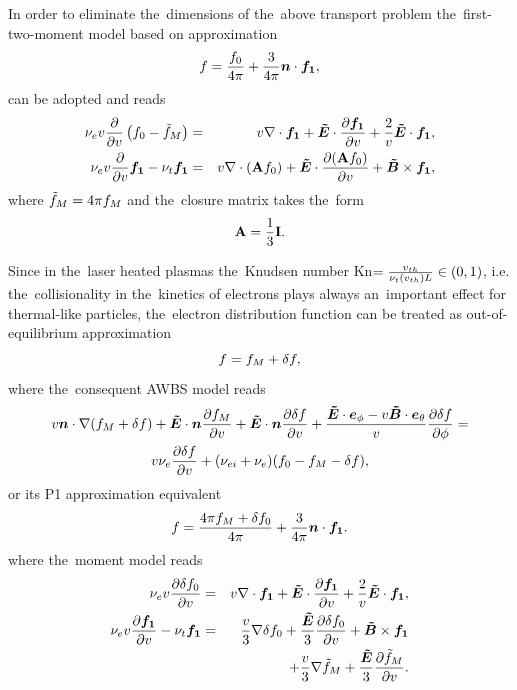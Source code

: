 In order to eliminate the~dimensions of the~above transport problem 
the~first-two-moment model based on approximation 
\begin{equation}
  f = \frac{f_0}{4\pi} + \frac{3}{4\pi}\boldsymbol{n}\cdot{\boldsymbol{f_1}} , 
  \nonumber \label{eq:OOE_P1approximation}
\end{equation}
can be adopted and reads
\begin{eqnarray}
  \nu_{e}v\frac{\partial{}}{\partial{v}}\left(f_0 - \tilde{f}_M \right) &=&
  v\nabla\cdot{\boldsymbol{f_1}} + \boldsymbol{\tilde{E}}\cdot
  \frac{\partial{{\boldsymbol{f_1}}}}{\partial{v}} + \frac{2}{v}\boldsymbol{\tilde{E}}\cdot{\boldsymbol{f_1}} , 
  \nonumber \label{eq:OOE_P1f0}\\
  \nu_{e}v\frac{\partial{}}{\partial{v}}{\boldsymbol{f_1}} - \nu_{t}{\boldsymbol{f_1}} &=& 
  v\nabla\cdot\left(\mathbf{A}f_0\right) + 
  \boldsymbol{\tilde{E}}\cdot\frac{\partial{\left(\mathbf{A}f_0\right)}}{\partial{v}} + \boldsymbol{\tilde{B}}\times{\boldsymbol{f_1}} ,
  \nonumber \label{eq:OOE_P1f1}
\end{eqnarray}
where $\tilde{f}_M = 4\pi f_M$ and the~closure matrix takes the~form
\begin{equation}
  \mathbf{A} = \frac{1}{3}\mathbf{I} .
  \nonumber \label{eq:OOE_P1closure}
\end{equation}

Since in the~laser heated plasmas the~Knudsen number 
Kn$ = \frac{v_{th}}{\nu_t(v_{th}) L} \in (0, 1)$, i.e. the~collisionality in 
the~kinetics of electrons plays always an~important effect for thermal-like 
particles, the~electron distribution 
function can be treated as out-of-equilibrium approximation 
\begin{equation}
  f = f_M + \delta f ,
  \label{eq:OOE_outofeq}
\end{equation}  
where the~consequent AWBS model reads
\begin{multline}
  v\boldsymbol{n}\cdot\nabla (f_M + \delta f) + \boldsymbol{\tilde{E}}\cdot\boldsymbol{n} \frac{\partial{f_M}}{\partial{v}} 
  + \boldsymbol{\tilde{E}}\cdot\boldsymbol{n} \frac{\partial{\delta f}}{\partial{v}} 
  + \frac{\boldsymbol{\tilde{E}}\cdot\boldsymbol{e}_\phi 
  - v\boldsymbol{\tilde{B}}\cdot\boldsymbol{e}_\theta}{v}\frac{\partial{\delta f}}{\partial{\phi}}
  = \\
  v \nu_{e} \frac{\partial{\delta f}}{\partial{v}} 
  + (\nu_{ei} + \nu_{e}) (f_0 - f_M - \delta f) ,
  \label{eq:OOE_AWBS_model}
\end{multline}
or its P1 approximation equivalent
\begin{equation}
  f = \frac{4\pi f_M + \delta f_0}{4\pi} + \frac{3}{4\pi}\boldsymbol{n}\cdot{\boldsymbol{f_1}} .
  \label{eq:OOE_P1outofeq}
\end{equation}
where the~moment model reads
\begin{eqnarray}
  \nu_{e}v\frac{\partial{\delta f_0}}{\partial{v}} &=&
  v\nabla\cdot{\boldsymbol{f_1}} + \boldsymbol{\tilde{E}}\cdot
  \frac{\partial{{\boldsymbol{f_1}}}}{\partial{v}} + \frac{2}{v}\boldsymbol{\tilde{E}}\cdot{\boldsymbol{f_1}} , 
  \label{eq:OOE_P1f0}\\
  \nu_{e}v\frac{\partial{{\boldsymbol{f_1}}}}{\partial{v}} - \nu_{t}{\boldsymbol{f_1}} &=& 
  \frac{v}{3}\nabla\delta f_0 + 
  \frac{\boldsymbol{\tilde{E}}}{3}\frac{\partial{\delta f_0}}{\partial{v}} + \boldsymbol{\tilde{B}}\times{\boldsymbol{f_1}} 
  \nonumber \\
  & & + \frac{v}{3}\nabla\tilde{f}_M + \frac{\boldsymbol{\tilde{E}}}{3}\frac{\partial{\tilde{f}_M}}{\partial{v}} .
  \label{eq:OOE_P1f1}
\end{eqnarray}

